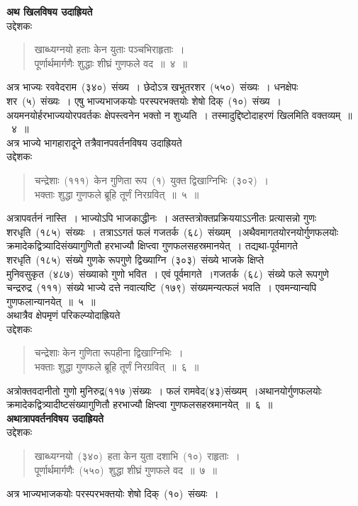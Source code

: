\documentclass[11pt, openany]{book}
\begin{document}
\newpage
\thispagestyle{fancy}
\fancyhf{}
\indent
\textbf{अथ खिलविषय उदाह्रियते \textendash}\\
उद्देशकः \textendash
\begin{quote}
{\ku खाब्ध्यग्नयो हताः केन युताः पञ्चभिराहृताः~।\\
पूर्णार्थमार्गणैः शुद्धाः शीघ्रं गुणफले वद~॥~४~॥}
\end{quote}
\indent
अत्र भाज्यः रववेदराम~(३४०)~संख्य~। छेदोऽत्र खभूतरशर~(५५०)~संख्यः~। धनक्षेपः शर~(५)~संख्यः~। एषु भाज्यभाजकयोः परस्परभक्तयोः शेषो दिक्~(१०)~संख्य~। अयमनयोर्हरभाज्ययोरपवर्तकः क्षेपस्त्वनेन भक्तो न शुध्यति~। तस्मादुद्दिष्टोदाहरणं खिलमिति वक्तव्यम्~॥~४~॥\\
अत्र भाज्ये भागहारादूने तत्रैवानपवर्तनविषय उदाह्रियते \textendash\\
	उद्देशकः \textendash 
\begin{quote}
{\ku चन्द्रेशाः~(१११)~केन गुणिता रूप~(१)~युक्त द्विखाग्निभिः~(३०२)~।\\
भक्ताः शुद्धा गुणफले ब्रूहि तूर्णं निरग्रवित्~॥~५~॥}
\end{quote}
\indent
अत्रापवर्तनं नास्ति~। भाज्योऽपि भाजकाद्धीनः~। अतस्तत्रोक्तप्रक्रिययाऽऽनीतः प्रत्यासन्नो गुणः शरधृति~(१८५)~संख्यः~। तत्राऽऽगतं फलं गजतर्क~(६८)~संख्यम्~।अथैवमागतयोरनयोर्गुणफलयोः क्रमादेकद्वित्र्यादिसंख्यागुणितौ हरभाज्यौ क्षिप्त्वा गुणफलसहस्रमानयेत्~। तद्यथा-पूर्वमागते शरधृति~(१८५)~संख्ये गुणके रूपगुणे द्विख्याग्नि~(३०३)~संख्ये भाजके क्षिप्ते मुनिवसुकृत~(४८७)~संख्याको गुणो भवित~। एवं पूर्वमागते~।गजतर्क~(६८)~संख्ये फले रूपगुणे चन्द्ररुद्र~(१११)~संख्ये भाज्ये दत्ते नवात्यष्टि~(१७९)~संख्यमन्यत्फलं भवति~। एवमन्यान्यपि गुणफलान्यानयेत्~॥~५~॥\\
अथात्रैव क्षेपमृणं परिकल्प्योदाह्रियते\textendash\\ 
उद्देशकः \textendash 
\begin{quote}
{\ku चन्द्रेशाः केन गुणिता रूपहीना द्विखाग्निभिः~।\\
भक्ताः शुद्धा गुणफले ब्रूहि तूर्णं निरग्रवित्~॥~६~॥}
\end{quote}
अत्रोक्तवदानीतो गुणो मुनिरुद्र(११७ )संख्यः~। फलं रामवेद(४३)संख्यम्~।अथानयोर्गुणफलयोः क्रमादेकद्वित्र्यादीष्टसंख्यागुणितौ हरभाज्यौ क्षिप्त्वा गुणफलसहस्रमानयेत्~॥~६~॥\\
\indent
\textbf{अथात्रापवर्तनविषय उदाह्रियते\textendash}\\
उद्देशकः\textendash 
\begin{quote}
{\ku खाब्ध्यग्नयो~(३४०)~हता केन युता दशाभि~(१०)~राहृताः~।\\
पूर्णार्थमार्गणैः~(५५०)~शुद्धा शीघ्रं गुणफले वद~॥~७~॥}\\
\end{quote}
अत्र भाज्यभाजकयोः परस्परभक्तयोः शेषो दिक्~(१०)~संख्यः~।
\end{document}
